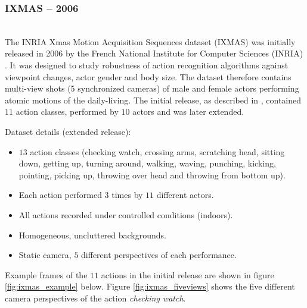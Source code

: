 \subsubsection{IXMAS -- 2006}
\cite{weinland_free_2006}\\
The INRIA Xmas Motion Acquisition Sequences dataset (IXMAS) was initially released in 2006 by the French National Institute for Computer Sciences (INRIA) \cite{weinland_free_2006}.
It was designed to study robustness of action recognition algorithms against viewpoint changes, actor gender and body size.
The dataset therefore contains multi-view shots (5 synchronized cameras) of male and female actors performing atomic motions of the daily-living.
The initial release, as described in \cite{weinland_free_2006}, contained $11$ action classes, performed by $10$ actors and was later extended.

Dataset details (extended release): \cite{_inria_????}
\begin{itemize}
    \item $13$ action classes (checking watch, crossing arms, scratching head, sitting down, getting up, turning around, walking, waving, punching, kicking, pointing, picking up, throwing over head and throwing from bottom up).
    \item Each action performed $3$ times by $11$ different actors.
    \item All actions recorded under controlled conditions (indoors).
    \item Homogeneous, uncluttered backgrounds.
    \item Static camera, $5$ different perspectives of each performance.
\end{itemize}

Example frames of the $11$ actions in the initial release are shown in figure \ref{fig:ixmas_example} below.
Figure \ref{fig:ixmas_fiveviews} shows the five different camera perspectives of the action \textit{checking watch}.

